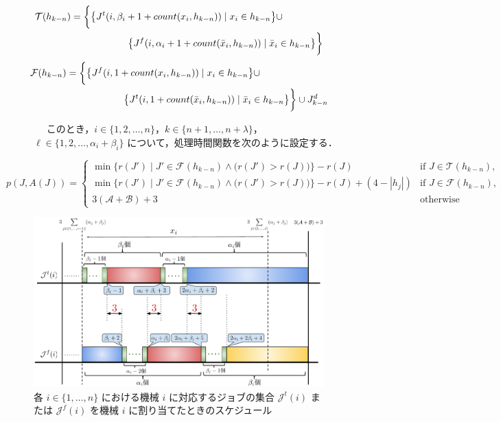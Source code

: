\documentclass[12pt]{optlab-bachelor}
\begin{document}
\begin{equation}
  \begin{split}
    \mathcal{T}(h_{k - n}) &= \bigg\{\big\{J^t(i,\beta_i + 1 +
    count(x_i,h_{k - n})) \mid x_i \in h_{k - n}\big\} \cup \\ &\qquad \qquad\qquad \big\{J^f(i,\alpha_i + 1 + count(\bar x_i, h_{k - n})) \mid \bar x_i \in h_{k - n}\big\}\bigg\} \notag
  \end{split}
\end{equation}
\begin{equation}
  \begin{split}
    \mathcal{F}(h_{k - n}) &= \bigg\{\big\{J^f(i,1 + count(
    x_i,h_{k - n})) \mid x_i \in h_{k - n} \big\} \cup \\ &\qquad\qquad\qquad \big\{J^t(i,1 + count(\bar x_i,h_{k - n})) \mid \bar x_i \in h_{k - n}\big\} \bigg\} \cup J^d_{k - n} \notag
  \end{split}
\end{equation}
\begin{description}
  \item[] ~~ このとき，$i \in \{1,2,\ldots,n\}$，$k \in \{n + 1, \ldots , n + \lambda\}$，$\ell \in \{1,2,\ldots, \alpha_i + \beta_i\}$ について，処理時間関数を次のように設定する．
\end{description}
{\small
\begin{equation}
  p(J,A(J)) = \left\{ \begin{array}{lll} \min \bigg\{r(J') \mid
  J' \in \mathcal{F}(h_{k - n}) \wedge \big(r(J') > r(J) \big) \bigg\} - r(J)
  & \text{if } J \in \mathcal{T}(h_{k - n}), \\ \min \bigg\{r(J') \mid
  J' \in \mathcal{F}(h_{k - n}) \wedge \big(r(J') > r(J) \big) \bigg\} - r(J)
  + (4 - |h_j|) & \text{if } J \in \mathcal{F}(h_{k - n}), \\ 3(\mathcal{A} + \mathcal{B}) + 3 & \text{otherwise}\end{array} \right. \tag{B.1}
\end{equation}
}

\begin{figure}[h]
  \centering
  \includegraphics[width = 16cm]{figure/3SAT1.pdf}
  \caption{各 $i \in \{1,\ldots,n\}$ における機械 $i$ に対応するジョブの集合 $\mathcal{J}^t(i)$ または $\mathcal{J}^f(i)$ を機械 $i$ に割り当てたときのスケジュール}
\end{figure}
\end{document}
